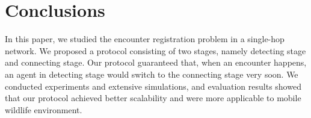 \section{Conclusions}
\label{sectionconclusion}
\vspace{-0.01in}
In this paper, we studied the encounter registration problem in a single-hop network.
We proposed a protocol consisting of two stages, namely detecting stage and 
connecting stage. Our protocol guaranteed that, when an encounter happens, 
an agent in detecting stage would switch 
to the connecting stage very soon. 
We conducted experiments and extensive simulations, and 
evaluation results showed that our protocol achieved 
better scalability and were more applicable to mobile
wildlife environment.



